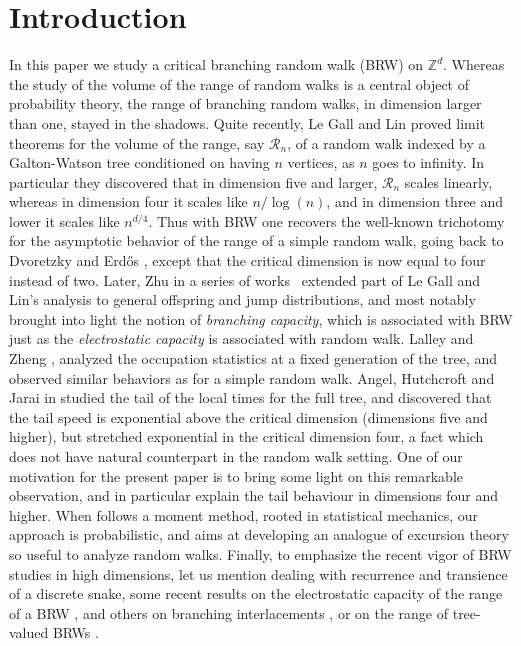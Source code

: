 \documentclass[JEP,XML,SOM,Unicode,NoFloatCountersInSection,published]{cedram}
\theoremstyle{plain}
\theoremstyle{definition}
\newcommand\Z{\mathbb{Z}}
\newcommand{\1}{{\text{\Large $\mathfrak 1$}}}
\begin{document}
\section{Introduction}\label{sec-intro}
In this paper we study a critical branching random walk (BRW) on $\Z^d$.
Whereas the study of the volume of the range of random walks is a central
object of probability theory, the range of branching random walks,
in dimension larger than one, stayed in the shadows.
Quite recently, Le Gall and Lin \cite{LGL1,LGL2} proved limit theorems
for the volume of the range, say $\mathcal R_n$, of a random walk indexed by a Galton-Watson tree
conditioned on having $n$ vertices, as $n$ goes
to infinity.
In particular they discovered that in dimension five and larger,
$\mathcal R_n$
scales linearly, whereas in dimension four it scales like
$n/\log(n)$, and in dimension three and lower it scales
like $n^{d/4}$. Thus with BRW one recovers the well-known trichotomy for the asymptotic behavior of the range
of a simple random walk, going back to Dvoretzky and Erd\H{o}s \cite{DE}, except that
the critical dimension is now equal to four instead of two.
Later, Zhu in a series of works~\cite{Zhu1,Zhu2,Zhu4,Zhu3} extended part of Le Gall and Lin's analysis to general offspring and jump distributions,
and most notably brought into light
the notion of {\it branching capacity}, which is associated with
BRW just as the {\it electrostatic capacity}
is associated with random walk.
Lalley and Zheng \cite{LZ11},
analyzed the occupation statistics at a fixed generation of the tree,
and observed similar behaviors as for a simple random walk.
Angel, Hutchcroft and Jarai in \cite{AHJ}
studied the tail of the local times for the full tree, and
discovered that the tail speed is
exponential above the critical dimension (dimensions five and higher), but
stretched exponential in the critical dimension four, a fact which does not have natural counterpart in the random walk setting.
One of our motivation for the present paper
is to bring some light on this remarkable observation, and in particular
explain the tail behaviour in dimensions four and higher.
When \cite{AHJ} follows a moment method, rooted in statistical mechanics,
our approach is probabilistic, and aims at developing an analogue of
excursion theory so useful to analyze random walks. Finally, to
emphasize the recent vigor of BRW studies in high dimensions,
let us mention \cite{BC12,LSS24} dealing with recurrence and transience of a discrete snake, some recent results
on the electrostatic capacity of the range of a BRW \cite{BW20,BH21,BH22},
and others on branching interlacements \cite{PZ19,Zhu18}, or on the range of tree-valued BRWs \cite{DKLT}.
\end{document}
